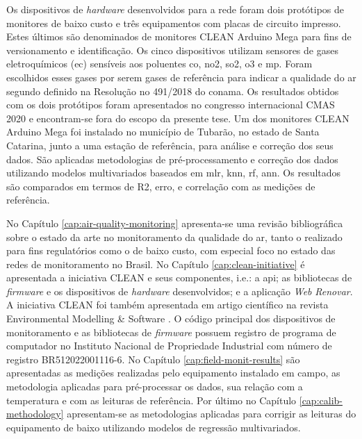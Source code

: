 Os dispositivos de \textit{hardware} desenvolvidos para a rede foram dois protótipos de monitores de baixo custo e três equipamentos com placas de circuito impresso. Estes últimos são denominados de monitores CLEAN Arduino Mega para fins de versionamento e identificação. Os cinco dispositivos utilizam sensores de gases eletroquímicos (\gls{ec}) sensíveis aos poluentes \acrshort{co}, \acrshort{no2}, \acrshort{so2}, \acrshort{o3} e \acrshort{mp}. Foram escolhidos esses gases por serem gases de referência para indicar a qualidade do ar segundo definido na Resolução no 491/2018 do \gls{conama}. Os resultados obtidos com os dois protótipos foram apresentados no congresso internacional CMAS 2020 \cite{Campo2020DEPLOYMENTRESULTS} e encontram-se fora do escopo da presente tese. Um dos monitores CLEAN Arduino Mega foi instalado no município de Tubarão, no estado de Santa Catarina, junto a uma estação de referência, para análise e correção dos seus dados. São aplicadas metodologias de pré-processamento e correção dos dados utilizando modelos multivariados baseados em \gls{mlr}, \gls{knn}, \gls{rf}, \gls{ann}. Os resultados são comparados em termos de R2, erro, e correlação com as medições de referência. 

No Capítulo \ref{cap:air-quality-monitoring} apresenta-se uma revisão bibliográfica sobre o estado da arte no monitoramento da qualidade do ar, tanto o realizado para fins regulatórios como o de baixo custo, com especial foco no estado das redes de monitoramento no Brasil. No Capítulo \ref{cap:clean-initiative} é apresentada a iniciativa CLEAN e seus componentes, i.e.: a \acrshort{api}; as bibliotecas de \textit{firmware} e os dispositivos de \textit{hardware} desenvolvidos; e a aplicação \textit{Web} \textit{Renovar}. A iniciativa CLEAN foi também apresentada em artigo científico na revista Environmental Modelling \& Software \cite{Campo2021}. O código principal dos dispositivos de monitoramento e as bibliotecas de \textit{firmware} possuem registro de programa de computador no Instituto Nacional de Propriedade Industrial com número de registro BR512022001116-6. No Capítulo \ref{cap:field-monit-results} são apresentadas as medições realizadas pelo equipamento instalado em campo, as metodologia aplicadas para pré-processar os dados, sua relação com a temperatura e com as leituras de referência. Por último no Capítulo \ref{cap:calib-methodology} apresentam-se as metodologias aplicadas para corrigir as leituras do equipamento de baixo utilizando modelos de regressão multivariados.